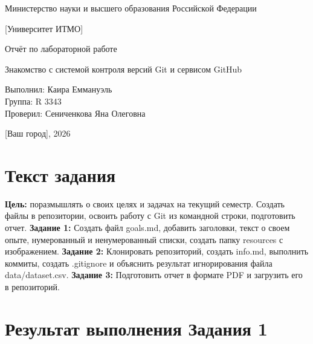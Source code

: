 \documentclass[a4paper,12pt]{article}
\begin{document}
\begin{titlepage}
\centering
{\large Министерство науки и высшего образования Российской Федерации\par}
\vspace{0.5cm}
{\large [Университет ИТМО]\par}
\vspace{2cm}
{\Large Отчёт по лабораторной работе\par}
\vspace{0.5cm}
{\large Знакомство с системой контроля версий Git и сервисом GitHub\par}
\vspace{2cm}
\begin{flushright}
Выполнил: Каира Еммануэль\\
Группа: R 3343\\
Проверил: Сениченкова Яна Олеговна
\end{flushright}
\vfill
{\large [Ваш город], 2026\par}
\end{titlepage}
\tableofcontents
\newpage
\section{Текст задания}
\textbf{Цель:} поразмышлять о своих целях и задачах на текущий семестр. Создать файлы в репозитории, освоить работу с Git из командной строки, подготовить отчет.
\textbf{Задание 1:} Создать файл goals.md, добавить заголовки, текст о своем опыте, нумерованный и ненумерованный списки, создать папку resources с изображением.
\textbf{Задание 2:} Клонировать репозиторий, создать info.md, выполнить коммиты, создать .gitignore и объяснить результат игнорирования файла data/dataset.csv.
\textbf{Задание 3:} Подготовить отчет в формате PDF и загрузить его в репозиторий.
\section{Результат выполнения Задания 1}
\end{document}
